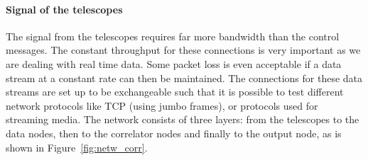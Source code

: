 \paragraph{Signal of the telescopes}
The signal from the telescopes requires far more bandwidth than the
control messages. The constant throughput for these connections is
very important as we are dealing with real time data. Some packet loss
is even acceptable if a data stream at a constant rate can then be
maintained. The connections for these data streams are set up to be
exchangeable such that it is possible to test different network
protocols like TCP (using jumbo frames), or protocols used for
streaming media. The network consists of three layers: from the
telescopes to the data nodes, then to the correlator nodes and finally
to the output node, as is shown in
Figure~\ref{fig:netw_corr}.



